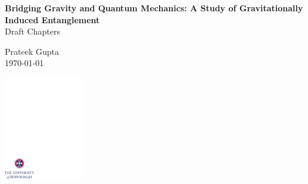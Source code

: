 \documentclass[12pt,a4paper]{report}
\theoremstyle{plain}
\theoremstyle{definition}
\theoremstyle{remark}
\begin{document}
\thispagestyle{empty}

%

\parindent=0pt          %
\parskip=5pt            %


\vspace*{0.1\textheight}

\begin{center}
        \huge{\bfseries Bridging Gravity and Quantum Mechanics: A Study of Gravitationally Induced Entanglement}\\ Draft Chapters%
\end{center}


\medskip

\begin{center}
        \Large{Prateek Gupta}\\  %
        \medskip
        \large{\today}  %
\end{center}


\vspace*{0.25\textheight}

\begin{center}
        \includegraphics[width=35mm]{crest.pdf}
\end{center}
\end{document}
